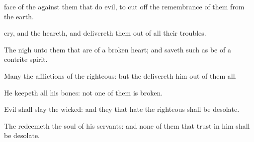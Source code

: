 {face of the
{}
{} against them that
do
evil, to cut
off the
remembrance of them from the
earth.
\par }{\Q {}
cry, and the
{}
heareth, and
delivereth them out of all their
troubles.
\par }{\Q {}The
{}
{}
nigh unto them that are of a
broken
heart; and
saveth such as be of a
contrite
spirit.
\par }{\Q {}Many
{} the
afflictions of the
righteous: but the
{}
delivereth him out of them all.
\par }{\Q {}He
keepeth all his
bones: not
one of
them is
broken.
\par }{\Q {}Evil shall
slay the
wicked: and they that
hate the
righteous shall be
desolate.
\par }{\Q {}The
{}
redeemeth the
soul of his
servants: and none of them that
trust in him shall be
desolate.

}
